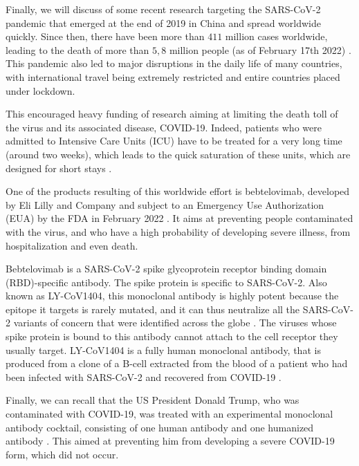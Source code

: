 Finally, we will discuss of some recent research targeting the SARS-CoV-2 pandemic
that emerged at the end of 2019 in China and spread worldwide quickly. Since then, there have
been more than $411$ million cases worldwide, leading to the death of more than $5,8$ million
people (as of February 17th 2022) \cite{noauthor_covid-19_nodate}.
This pandemic also led to major disruptions in the daily
life of many countries, with international travel being extremely restricted and entire 
countries placed under lockdown.

This encouraged heavy funding of research aiming at limiting the death toll of the
virus and its associated disease, COVID-19. Indeed, patients who were admitted to
Intensive Care Units (ICU) have to be treated for a very long time (around two weeks),
which leads to the quick saturation of these units, which are designed for short stays
\cite{mannucci_saturation_2020}.

One of the products resulting of this worldwide effort is bebtelovimab, developed
by Eli Lilly and Company and subject to an Emergency Use Authorization (EUA)
by the FDA in February 2022 \cite{office_of_the_commissioner_coronavirus_2022}
\cite{eli_lilly_lillys_2022}. It aims at preventing people contaminated with
the virus, and who have a high probability of developing severe illness, from
hospitalization and even death. 

Bebtelovimab is a SARS-CoV-2 spike glycoprotein receptor binding domain
(RBD)-specific antibody. The spike protein is specific to SARS-CoV-2.
Also known as LY-CoV1404, this monoclonal antibody is highly potent because
the epitope it targets is rarely mutated, and it can thus neutralize all the
SARS-CoV-2 variants of concern that were identified across 
the globe \cite{westendorf_ly-cov1404_2022}. The viruses whose spike protein
is bound to this antibody cannot attach to the cell receptor they usually target.
LY-CoV1404 is a fully human monoclonal antibody, that is produced from a clone
of a B-cell extracted from the blood of a patient who had been infected with
SARS-CoV-2 and recovered from COVID-19 \cite{westendorf_ly-cov1404_2022}.

Finally, we can recall that the US President Donald Trump, who was contaminated
with COVID-19, was treated with an experimental monoclonal antibody cocktail,
consisting of one human antibody and one humanized antibody \cite{cohen_update_2020}. 
This aimed at preventing him from developing a severe COVID-19 form, which did not occur.
